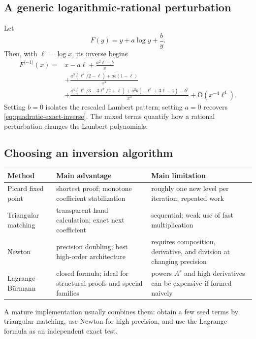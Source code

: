 \documentclass[11pt,oneside]{article}
\numberwithin{equation}{section}
\theoremstyle{definition}
\newcommand{\rev}{\langle -1\rangle}
\newcommand{\bigO}{\mathrm{O}}
\begin{document}
\subsection{A generic logarithmic-rational perturbation}

Let
\begin{equation}\label{eq:generic-ab-map}
  F(y)=y+a\log y+\frac{b}{y}.
\end{equation}
Then, with \(\ell=\log x\), its inverse begins
\begin{align}
 F^{\rev}(x)={}&x-a\ell
 +\frac{a^2\ell-b}{x}\nonumber\\
 &+\frac{a^3(\ell^2/2-\ell)+ab(1-\ell)}{x^2}\nonumber\\
 &+\frac{a^4(\ell^3/3-3\ell^2/2+\ell)
          +a^2b(-\ell^2+3\ell-1)-b^2}{x^3}
 +\bigO(x^{-4}\ell^4).
 \label{eq:generic-ab-inverse}
\end{align}
Setting \(b=0\) isolates the rescaled Lambert pattern; setting \(a=0\)
recovers \eqref{eq:quadratic-exact-inverse}.  The mixed terms quantify how a
rational perturbation changes the Lambert polynomials.

\subsection{Choosing an inversion algorithm}

\begin{center}
\begin{tabularx}{0.97\textwidth}{@{}p{}p{}X@{}}
\toprule
Method & Main advantage & Main limitation\\
\midrule
Picard fixed point & shortest proof; monotone coefficient stabilization & roughly one new level per iteration; repeated work\\
Triangular matching & transparent hand calculation; exact next coefficient & sequential; weak use of fast multiplication\\
Newton & precision doubling; best high-order architecture & requires composition, derivative, and division at changing precision\\
Lagrange--B\"urmann & closed formula; ideal for structural proofs and special families & powers \(A^r\) and high derivatives can be expensive if formed naively\\
\bottomrule
\end{tabularx}
\end{center}

A mature implementation usually combines them: obtain a few seed terms by
triangular matching, use Newton for high precision, and use the Lagrange formula
as an independent exact test.
\end{document}
